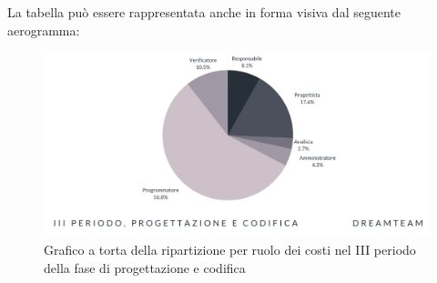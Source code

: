 La tabella può essere rappresentata anche in forma visiva dal seguente aerogramma:
\begin{figure}[H]
\centering
\includegraphics[scale=0.65]{Sezioni/SezioniPreventivo/grafici/Progettazione_III_periodo_costi.png}
\caption{Grafico a torta della ripartizione per ruolo dei costi nel III periodo della fase di progettazione e codifica}
\end{figure}



